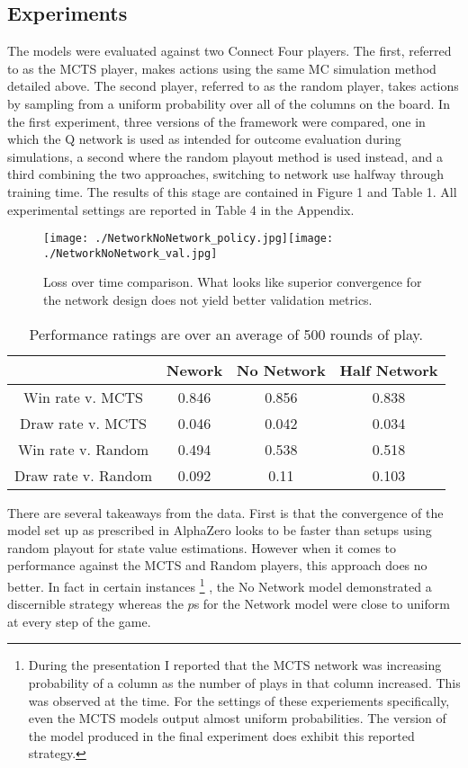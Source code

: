\documentclass[twoside,11pt]{article}
\begin{document}
\subsection{Experiments}
The models were evaluated against two Connect Four players. The first, referred to
as the MCTS player, makes actions using the same MC simulation method detailed above.
The second player, referred to as the random player, takes actions by sampling 
from a uniform probability over all of the columns on the board. 
In the first experiment, three versions of the framework were compared, 
one in which the Q network is used
as intended for outcome evaluation during simulations, a second where the random 
playout method is used instead, and a third combining 
the two approaches, switching to network use halfway through training time.
The results of this stage are contained in Figure 1 and Table 1. All experimental settings
are reported in Table 4 in the Appendix.

\begin{figure}[h]
    \centering
    \texttt{[image: ./NetworkNoNetwork\_policy.jpg]}\texttt{[image: ./NetworkNoNetwork\_val.jpg]}
    \caption{Loss over time comparison. What looks like superior convergence for the network design does not yield 
     better validation metrics.}
\end{figure}

\begin{table}[ht]
\caption{Performance ratings are over an average of 500 rounds of play.}
\begin{center}
    \begin{tabular}{||c ||c c c||} 
    \hline
     & Nework & No Network & Half Network \\ [0.5ex] 
    \hline\hline
    Win rate v. MCTS & 0.846 & 0.856 & 0.838\\ 
    \hline
    Draw rate v. MCTS & 0.046 & 0.042 & 0.034 \\
    \hline
    Win rate v. Random & 0.494 & 0.538 & 0.518 \\
    \hline
    Draw rate v. Random & 0.092 & 0.11 & 0.103 \\
    \hline
   \end{tabular}
   \end{center}
\end{table}

There are several takeaways from the data. First is that the convergence of the model
set up as prescribed in AlphaZero looks to be faster than setups using random playout
for state value estimations. However when it comes to performance against the MCTS and Random players,
this approach does no better. In fact in certain instances \footnote{During the presentation I reported
that the MCTS network was increasing probability of a column as the number of plays in that column increased.
This was observed at the time. For the settings of these experiements specifically, even the MCTS models output almost
uniform probabilities. The version of the model produced in the final experiment does exhibit this reported strategy.} , the No Network model demonstrated a
discernible strategy whereas the $p$s for the Network model were close to uniform at every step of the game. 
\end{document}
